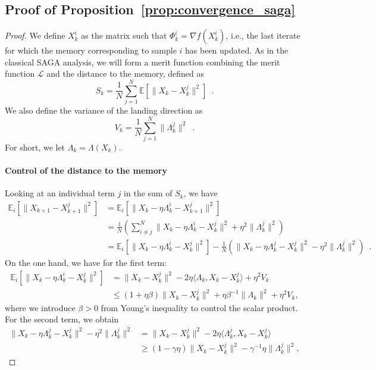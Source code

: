 \documentclass[twoside,11pt]{article}
\begin{document}
\subsection{Proof of Proposition~\ref{prop:convergence_saga}}
\begin{proof}
    We define $X_k^i$ as the matrix such that $\Phi_k^i = \nabla f(X_k^i)$, i.e., the last iterate for which the memory corresponding to sample $i$ has been updated. As in the classical SAGA analysis, we will form a merit function combining the merit function $\mathcal{L}$ and the distance to the memory, defined as 
    $$S_k = \frac1N\sum_{j=1}^N\mathbb{E}[\|X_k - X_k^j\|^2]\enspace.$$
We also define the variance of the landing direction as 
$$
V_k = \frac1N\sum_{j=1}^N\|\Lambda_k^j\|^2\enspace.
$$
For short, we let $\Lambda_k = \Lambda(X_k)$.
    \paragraph{Control of the distance to the memory}
    Looking at an individual term $j$ in the sum of $S_k$, we have
    \begin{align}
        \mathbb{E}_i[\|X_{k+1} - X_{k+1}^j\|^2] &= \mathbb{E}_i[\|X_{k} - \eta \Lambda_k^i -  X_{k+1}^j\|^2]\\
        &= \frac1N (\sum_{i\neq j}^N\|X_{k} - \eta \Lambda_k^i -  X_{k}^j\|^2 + \eta^2 \|\Lambda_k^j\|^2)\\
        &=\mathbb{E}_i[\|X_{k} - \eta \Lambda_k^i -  X_{k}^j\|^2] -\frac1N(\|X_{k} - \eta \Lambda_k^j -  X_{k}^j\|^2 -\eta^2 \|\Lambda_k^j\|^2)\enspace.
    \end{align}
    On the one hand, we have for the first term:
    \begin{align}
        \mathbb{E}_i[\|X_{k} - \eta \Lambda_k^i -  X_k^j\|^2] &= \|X_{k}  -  X_k^j\|^2 -2\eta \langle \Lambda_k, X_{k}  -  X_k^j\rangle +\eta^2V_k\\
        &\leq (1+\eta \beta)\|X_{k}  -  X_k^j\|^2 + \eta \beta^{-1}\|\Lambda_k\|^2 + \eta^2V_k,
    \end{align}
    where we introduce $\beta >0$ from Young's inequality to control the scalar product.
    For the second term, we obtain
    \begin{align}
        \|X_{k} - \eta \Lambda_k^j -  X_{k}^j\|^2 - \eta^2\|\Lambda_k^j\|^2 &= \|X_k - X_k^j\|^2 - 2\eta \langle  \Lambda_k^j, X_k - X_k^j\rangle\\
        &\geq (1 - \gamma \eta)\|X_k - X_k^j\|^2 - \gamma^{-1} \eta\|\Lambda_k^j\|^2,
    \end{align}

\end{proof}
\end{document}
